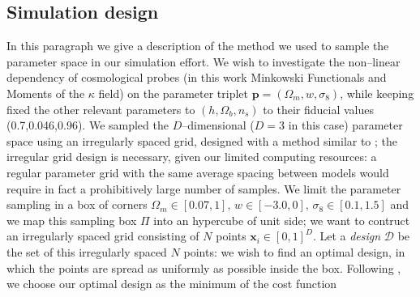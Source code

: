 \documentclass[reprint,aps,prd,superscriptaddress,showkeys,showpacs]{revtex4-1}
\begin{document}
\subsection{Simulation design}
In this paragraph we give a description of the method we used to sample the parameter space in our simulation effort. We wish to investigate the non--linear dependency of cosmological probes (in this work Minkowski Functionals and Moments of the $\kappa$ field) on the parameter triplet $\mathbf{p}=(\Omega_m,w,\sigma_8)$, while keeping fixed the other relevant parameters to $(h,\Omega_b,n_s)$ to their fiducial values (0.7,0.046,0.96). We sampled the $D$--dimensional ($D=3$ in this case) parameter space using an irregularly spaced grid, designed with a method similar to \citep{coyote2}; the irregular grid design is necessary, given our limited computing resources: a regular parameter grid with the same average spacing between models would require in fact a prohibitively large number of samples. We limit the parameter sampling in a box of corners $\Omega_m\in[0.07,1],\,w\in[-3.0,0],\,\sigma_8\in[0.1,1.5]$ and we map this sampling box $\Pi$ into an hypercube of unit side; we want to contruct an irregularly spaced grid consisting of $N$ points $\mathbf{x}_i\in[0,1]^D$. Let a \textit{design} $\mathcal{D}$ be the set of this irregularly spaced $N$ points: we wish to find an optimal design, in which the points are spread as uniformly as possible inside the box. Following \citep{coyote2}, we choose our optimal design as the minimum of the cost function

\end{document}
